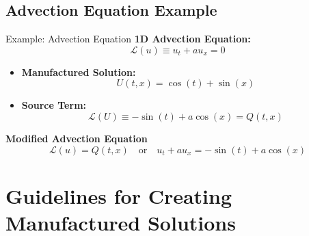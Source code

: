 \documentclass{beamer}
\begin{document}
\subsection{Advection Equation Example}

\begin{frame}{Example: Advection Equation}
    \textbf{1D Advection Equation:}
    \begin{equation} \label{1}
        \mathcal{L}(u) \equiv u_t + a u_x = 0
    \end{equation}
    \begin{itemize}
        \item \textbf{Manufactured Solution:}
        \[ 
            U(t,x) = \cos(t) + \sin(x)
        \]
        \item \textbf{Source Term:}
        \[
            \mathcal{L}(U) \equiv -\sin(t) + a\cos(x) = Q(t,x)
        \]
    \end{itemize}
    \textbf{Modified Advection Equation}
        \[
            \mathcal{L}(u) = Q(t,x) \quad\text{or}\quad u_t + a u_x = -\sin(t) + a\cos(x) 
        \]
\end{frame}

\section{Guidelines for Creating Manufactured Solutions}
\end{document}
